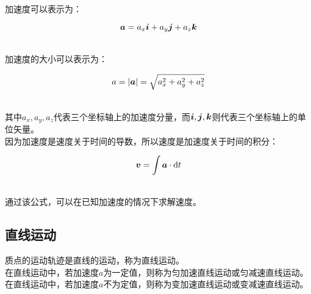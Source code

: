 \documentclass[UTF8]{ctexart}
\newcommand*{\veb}[1]{\vb*{#1}}
\newcommand*{\dif}{\mathop{}\!\mathrm{d}}
\begin{document}
    加速度可以表示为：
    \begin{large}
        \begin{equation*}
            \veb{a}=a_x\veb{i}+a_y\veb{j}+a_z\veb{k}
        \end{equation*}
    \end{large}\\
    加速度的大小可以表示为：
    \begin{large}
        \begin{equation*}
            a=|\veb{a}|=\sqrt{a_x^2+a_y^2+a_z^2}
        \end{equation*}
    \end{large}\\
    其中$a_x,a_y,a_z$代表三个坐标轴上的加速度分量，而$\veb{i},\veb{j},\veb{k}$则代表三个坐标轴上的单位矢量。\\[6mm]
    因为加速度是速度关于时间的导数，所以速度是加速度关于时间的积分：\vspace{5pt}
    \begin{large}
        \begin{equation*}
            \veb{v}=\int \veb{a}\cdot\dif t
        \end{equation*}
    \end{large}\\
    通过该公式，可以在已知加速度的情况下求解速度。

\newpage

\subsection{直线运动}
    质点的运动轨迹是直线的运动，称为直线运动。\\[3mm]
    在直线运动中，若加速度$a$为一定值，则称为匀加速直线运动或匀减速直线运动。\\[3mm]
    在直线运动中，若加速度$a$不为定值，则称为变加速直线运动或变减速直线运动。
\end{document}
